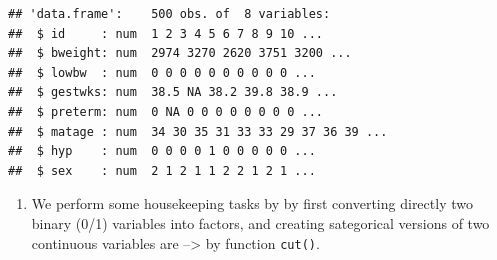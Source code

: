 \documentclass[
]{book}
\newenvironment{Shaded}{\begin{snugshade}}{\end{snugshade}}
\newcommand{\AttributeTok}[1]{\textcolor[rgb]{0.13,0.29,0.53}{#1}}
\newcommand{\ConstantTok}[1]{\textcolor[rgb]{0.56,0.35,0.01}{#1}}
\newcommand{\DecValTok}[1]{\textcolor[rgb]{0.00,0.00,0.81}{#1}}
\newcommand{\FunctionTok}[1]{\textcolor[rgb]{0.13,0.29,0.53}{\textbf{#1}}}
\newcommand{\NormalTok}[1]{#1}
\newcommand{\OtherTok}[1]{\textcolor[rgb]{0.56,0.35,0.01}{#1}}
\newcommand{\SpecialCharTok}[1]{\textcolor[rgb]{0.81,0.36,0.00}{\textbf{#1}}}
\newcommand{\StringTok}[1]{\textcolor[rgb]{0.31,0.60,0.02}{#1}}
\providecommand{\tightlist}{%
  \setlength{\itemsep}{0pt}\setlength{\parskip}{0pt}}
\theoremstyle{definition}
\theoremstyle{definition}
\theoremstyle{definition}
\theoremstyle{definition}
\theoremstyle{remark}
\begin{document}
\begin{verbatim}
## 'data.frame':    500 obs. of  8 variables:
##  $ id     : num  1 2 3 4 5 6 7 8 9 10 ...
##  $ bweight: num  2974 3270 2620 3751 3200 ...
##  $ lowbw  : num  0 0 0 0 0 0 0 0 0 0 ...
##  $ gestwks: num  38.5 NA 38.2 39.8 38.9 ...
##  $ preterm: num  0 NA 0 0 0 0 0 0 0 0 ...
##  $ matage : num  34 30 35 31 33 33 29 37 36 39 ...
##  $ hyp    : num  0 0 0 0 1 0 0 0 0 0 ...
##  $ sex    : num  2 1 2 1 1 2 2 1 2 1 ...
\end{verbatim}

\begin{enumerate}
\def\labelenumi{\arabic{enumi}.}
\setcounter{enumi}{1}
\tightlist
\item
  We perform some housekeeping tasks by
  by first converting directly two binary (0/1) variables into factors,
  and creating sategorical versions of two continuous variables are --\textgreater{}
  by function \texttt{cut()}.
\end{enumerate}

\begin{Shaded}
\end{Shaded}
\end{document}
